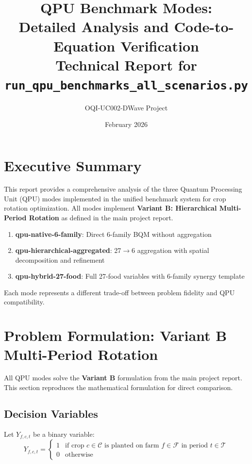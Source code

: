 \documentclass[11pt,a4paper]{article}
\title{\textbf{QPU Benchmark Modes: \\
Detailed Analysis and Code-to-Equation Verification}\\[0.5em]
\large Technical Report for \texttt{run\_qpu\_benchmarks\_all\_scenarios.py}}
\author{OQI-UC002-DWave Project}
\date{February 2026}
\begin{document}
\maketitle

\tableofcontents
\newpage

\section{Executive Summary}

This report provides a comprehensive analysis of the three Quantum Processing Unit (QPU) modes implemented in the unified benchmark system for crop rotation optimization. All modes implement \textbf{Variant B: Hierarchical Multi-Period Rotation} as defined in the main project report.

\begin{enumerate}
    \item \textbf{qpu-native-6-family}: Direct 6-family BQM without aggregation
    \item \textbf{qpu-hierarchical-aggregated}: 27$\to$6 aggregation with spatial decomposition and refinement
    \item \textbf{qpu-hybrid-27-food}: Full 27-food variables with 6-family synergy template
\end{enumerate}

Each mode represents a different trade-off between problem fidelity and QPU compatibility.

\section{Problem Formulation: Variant B Multi-Period Rotation}

All QPU modes solve the \textbf{Variant B} formulation from the main project report. This section reproduces the mathematical formulation for direct comparison.

\subsection{Decision Variables}

Let $Y_{f,c,t}$ be a binary variable:
\begin{equation}
Y_{f,c,t} = \begin{cases} 
1 & \text{if crop } c \in \mathcal{C} \text{ is planted on farm } f \in \mathcal{F} \text{ in period } t \in \mathcal{T} \\
0 & \text{otherwise}
\end{cases}
\end{equation}
\end{document}
